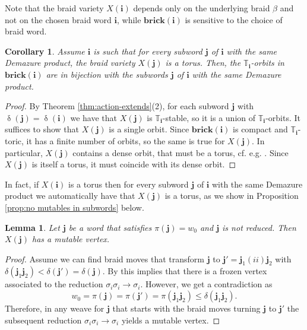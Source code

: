 \documentclass[a4paper, 11pt]{amsart}
\newcommand{\brick}{\mathbf{brick}}
\newcommand{\word}[1]{\mathbf{#1}}
\DeclareMathOperator{\dem}{\delta}
\newcommand{\dil}[1]{\mathbb{T}_{#1}}
\newtheorem{corollary}[theorem]{Corollary}%
\newtheorem{lemma}[theorem]{Lemma}%
\theoremstyle{definition}
\begin{document}
Note that the braid variety $X(\word{i})$ depends only on the underlying braid $\beta$ and not on the chosen braid word $\word{i}$, while $\brick(\word{i})$ is sensitive to the choice of braid word.

\begin{corollary}
\label{cor:subwords_tori_orbits}
Assume $\word{i}$ is such that for every subword $\word{j}$ of $\word{i}$ with the same Demazure product, the braid variety $X(\word{j})$ is a torus. 
Then, the $\dil{\word{i}}$-orbits in $\brick(\word{i})$ are in bijection with the subwords $\word{j}$ of $\word{i}$ with the same Demazure product.
\end{corollary}
\begin{proof}
    By Theorem \ref{thm:action-extends}(2), for each subword $\word{j}$ with $\dem(\word{j}) = \dem(\word{i})$ we have that $X(\word{j})$ is $\dil{\word{i}}$-stable, so it is a union of $\dil{\word{i}}$-orbits. It suffices to show that $X(\word{j})$ is a single orbit. Since $\brick(\word{i})$ is compact and $\dil{\word{i}}$-toric, it has a finite number of orbits, so the same is true for $X(\word{j})$. In particular, $X(\word{j})$ contains a dense orbit, that must be a torus, cf. e.g. \cite[Section 3.1]{Fulton}. Since $X(\word{j})$ is itself a torus, it must coincide with its dense orbit.
\end{proof}

In fact, if $X(\word{i})$ is a torus then for every subword $\word{j}$ of $\word{i}$ with the same Demazure product we automatically have that $X(\word{j})$ is a torus, as we show in Proposition \ref{prop:no mutables in subwords} below. 

\begin{lemma}\label{lem:criterion for mutables}
Let $\word{j}$ be a word that satisfies $\pi(\word{j})=w_0$ and $\word{j}$ is not reduced. Then $X(\word{j})$ has a mutable vertex.
\end{lemma}

\begin{proof}
Assume we can find braid moves that transform $\word{j}$ to $\word{j}'=\word{j}_1 (i i)\word{j}_2 $ with $\delta(\word{j}_1\word{j}_2)<\delta(\word{j}')=\delta(\word{j})$.
By \cite[Lemma 7.2]{CGGLSS} this implies that there is a frozen vertex associated to the reduction $\sigma_i\sigma_i\to \sigma_i$.
However, we get a contradiction as 
\[
w_0=\pi(\word{j})=\pi(\word{j}')=\pi(\word{j}_1\word{j}_2)\le \delta(\word{j}_1\word{j}_2).
\]
Therefore, in any weave for $\word{j}$ that starts with the braid moves turning $\word{j}$ to $\word{j}'$  the subsequent reduction $\sigma_i\sigma_i\to \sigma_i$ yields a mutable vertex.   
\end{proof}
\end{document}
